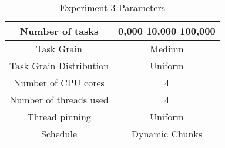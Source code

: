 \begin{table}
\centering
 \begin{tabular}{|c|c|}
  \hline
  Number of tasks & 0,000 10,000 100,000 \\
  \hline
  Task Grain & Medium \\
  \hline
  Task Grain Distribution & Uniform \\
  \hline
  Number of CPU cores & 4 \\
  \hline
  Number of threads used & 4 \\
  \hline
  Thread pinning & Uniform \\
  \hline
  Schedule & Dynamic Chunks \\
  \hline
 \end{tabular}
\caption{Experiment 3 Parameters}
\iflabelc
\label{table:evaluation_ex3_parameters}
\fi
{}
\end{table}
